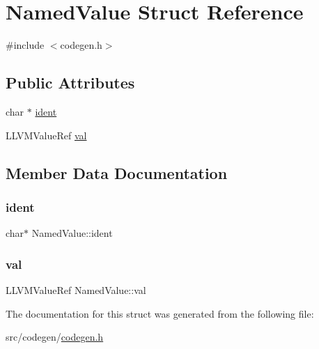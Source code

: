 \hypertarget{structNamedValue}{}\section{Named\+Value Struct Reference}
\label{structNamedValue}


{\ttfamily \#include $<$codegen.\+h$>$}

\subsection*{Public Attributes}
\begin{DoxyCompactItemize}
\item 
char $\ast$ \hyperlink{structNamedValue_aa038862cd6070bb43d4d80825a60189f}{ident}
\item 
L\+L\+V\+M\+Value\+Ref \hyperlink{structNamedValue_abc3aae67c1c320619b26e9415940f731}{val}
\end{DoxyCompactItemize}


\subsection{Member Data Documentation}
\hypertarget{structNamedValue_aa038862cd6070bb43d4d80825a60189f}{}\label{structNamedValue_aa038862cd6070bb43d4d80825a60189f} 
\subsubsection{\texorpdfstring{ident}{ident}}
{\footnotesize\ttfamily char$\ast$ Named\+Value\+::ident}

\hypertarget{structNamedValue_abc3aae67c1c320619b26e9415940f731}{}\label{structNamedValue_abc3aae67c1c320619b26e9415940f731} 
\subsubsection{\texorpdfstring{val}{val}}
{\footnotesize\ttfamily L\+L\+V\+M\+Value\+Ref Named\+Value\+::val}



The documentation for this struct was generated from the following file\+:\begin{DoxyCompactItemize}
\item 
src/codegen/\hyperlink{codegen_8h}{codegen.\+h}\end{DoxyCompactItemize}
